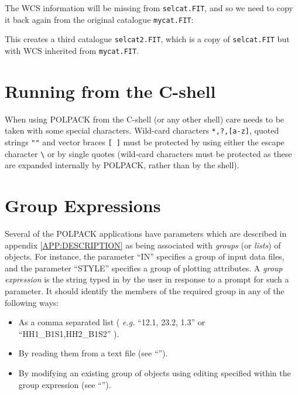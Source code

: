 \documentclass[twoside,11pt]{starlink}
\begin{document}
\begin{terminalv}
\end{terminalv}

The WCS information will be missing from \texttt{selcat.FIT}, and so we
need to copy it back again from the original catalogue \texttt{mycat.FIT}:

\begin{terminalv}
\end{terminalv}

This creates a third catalogue \texttt{selcat2.FIT}, which is a copy of
\texttt{selcat.FIT} but with WCS inherited from \texttt{mycat.FIT}.

\section{Running from the C-shell}
When using POLPACK from the C-shell (or any other shell) care needs to be
taken with some special characters. Wild-card characters \texttt{*,?,[a-z]},
quoted strings \texttt{""} and vector braces \texttt{[ ]} must be protected
by using either the escape character {\small \verb+\+} or by single
quotes (wild-card characters must be protected as these are expanded
internally by POLPACK, rather than by the shell).

\section{\label{SEC:GRPEXP}Group Expressions}
Several of the POLPACK applications have parameters which are described
in appendix \ref{APP:DESCRIPTION} as being associated with
\emph{groups} (or \emph{lists}) of objects. For instance, the
 parameter ``IN'' specifies a group of input data
files, and the  parameter ``STYLE'' specifies a
group of plotting attributes. A \emph{group expression} is the string
typed in by the user in response to a prompt for such a parameter. It
should identify the members of the required group in any of the following
ways:

\begin{itemize}
\item As a comma separated list ( \emph{e.g.} ``12.1, 23.2, 1.3''
     or ``HH1\_B1S1,HH2\_B1S2'' ).

\item By reading them from a text file (see
     ``'').

\item By modifying an existing group of objects using editing
     specified within the group expression (see
     ``'').
\end{itemize}
\end{document}
